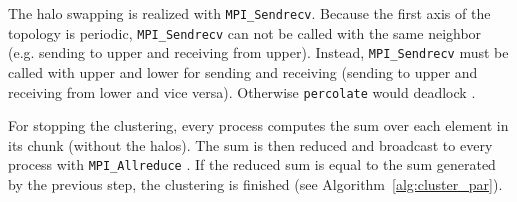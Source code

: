 \documentclass[twoside,11pt]{article}
\def\perc{\texttt{perco\-late}}
\begin{document}
The halo swapping is realized with \texttt{MPI\_Sendrecv}.
Because the first axis of the topology is periodic,
\texttt{MPI\_Sendrecv} can not be called with the same
neighbor (e.g. sending to upper and receiving from upper).
Instead, \texttt{MPI\_Sendrecv} must be called with
upper and lower for sending and receiving (sending to
upper and receiving from lower and vice versa).
Otherwise \perc{} would deadlock
\citep[see][Chapter 3]{mpi}.

For stopping the clustering, every process computes the
sum over each element in its chunk (without the halos).
The sum is then reduced and broadcast to every process
with \texttt{MPI\_Allreduce} \citep[see][Chapter 5]{mpi}.
If the reduced sum is equal to the sum generated by the
previous step, the clustering is finished (see
Algorithm~\ref{alg:cluster_par}).

\begin{algorithm} %
  \caption{: $c_{par}$}
  \label{alg:cluster_par}

  \begin{algorithmic}[1]
      \ENDIF
    \ENDWHILE
  \end{algorithmic}
\end{algorithm} %
\end{document}
